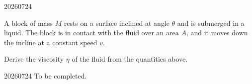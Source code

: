 

\begin{problem}{20260724}

A block of mass $M$ rests on a surface inclined at angle $\theta$ and is submerged in a liquid.  The block is in contact with the fluid over an area $A$, and it moves down the incline at a constant speed $v$.

\begin{questions}
  \item Derive the viscosity $\eta$ of the fluid from the quantities above.
\end{questions}

\end{problem}

\begin{solution}{20260724}
To be completed.
\end{solution}


